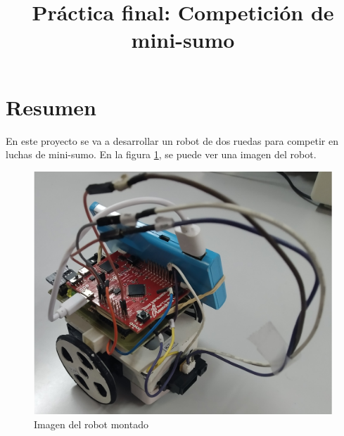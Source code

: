 \documentclass[conference]{IEEEtran}
\begin{document}
\title{Práctica final: Competición de mini-sumo\\
}

\author{
}

\maketitle

\section{\large{Resumen}}
\large{En este proyecto se va a desarrollar un robot de dos ruedas para competir en luchas de mini-sumo. En la figura \ref{fig:robot}, se puede ver una imagen del robot.}


\begin{figure}[h]
    \centering
    \includegraphics[width=0.9\linewidth, frame]{photos/microbot1_cut2.jpg}
    \caption{\large{Imagen del robot montado}}
    \label{fig:robot}
\end{figure}
\end{document}
